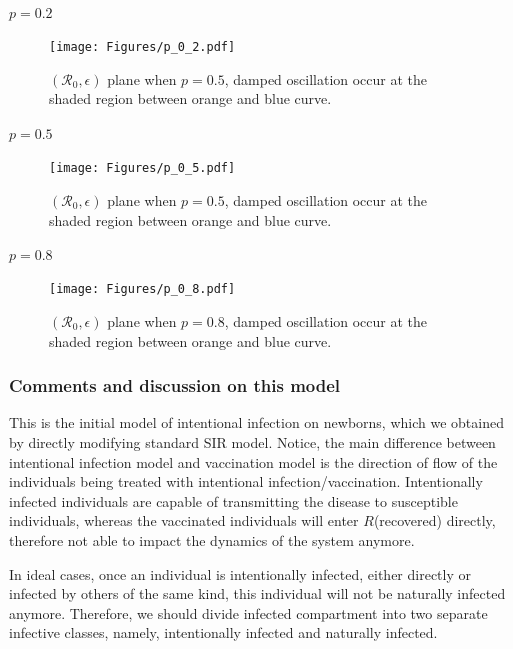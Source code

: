 \documentclass[12pt]{article}
\newcommand{\R}{\mathcal{R}}
\begin{document}
\paragraph{$p=0.2$}
\begin{figure}[H]
  \centering
  \texttt{[image: Figures/p\_0\_2.pdf]}
  \caption{$(\R_0,\epsilon)$ plane when $p=0.5$, damped oscillation occur at the shaded region between orange and blue curve.}
\end{figure}

\paragraph{$p=0.5$}
\begin{figure}[H]
  \centering
  \texttt{[image: Figures/p\_0\_5.pdf]}
  \caption{$(\R_0,\epsilon)$ plane when $p=0.5$, damped oscillation occur at the shaded region between orange and blue curve.}
\end{figure}

\paragraph{$p=0.8$}
\begin{figure}[H]
  \centering
  \texttt{[image: Figures/p\_0\_8.pdf]}
  \caption{$(\R_0,\epsilon)$ plane when $p=0.8$, damped oscillation occur at the shaded region between orange and blue curve.}
\end{figure}
\clearpage

\subsubsection{Comments and discussion on this model}
This is the initial model of intentional infection on newborns, which we obtained by directly modifying standard SIR model. Notice, the main difference between intentional infection model and vaccination model is the direction of flow of the individuals being treated with intentional infection/vaccination. Intentionally infected individuals are capable of transmitting the disease to susceptible individuals, whereas the vaccinated individuals will enter $R$(recovered) directly, therefore not able to impact the dynamics of the system anymore. 

In ideal cases, once an individual is intentionally infected, either directly or infected by others of the same kind, this individual will not be naturally infected anymore. Therefore, we should divide infected compartment into two separate infective classes, namely, intentionally infected and naturally infected.
\end{document}
